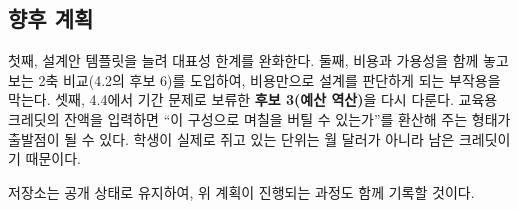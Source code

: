 \documentclass[10pt,a4paper]{article}
\begin{document}
\subsection{향후 계획}

첫째, 설계안 템플릿을 늘려 대표성 한계를 완화한다. 둘째, 비용과 가용성을 함께 놓고 보는 2축 비교(4.2의 후보 6)를 도입하여, 비용만으로 설계를 판단하게 되는 부작용을 막는다. 셋째, 4.4에서 기간 문제로 보류한 \textbf{후보 3(예산 역산)}을 다시 다룬다. 교육용 크레딧의 잔액을 입력하면 ``이 구성으로 며칠을 버틸 수 있는가''를 환산해 주는 형태가 출발점이 될 수 있다. 학생이 실제로 쥐고 있는 단위는 월 달러가 아니라 남은 크레딧이기 때문이다.

저장소는 공개 상태로 유지하여, 위 계획이 진행되는 과정도 함께 기록할 것이다.

\newpage
{
\small


}
\end{document}
